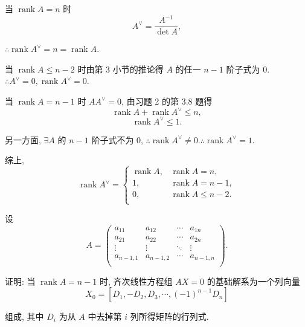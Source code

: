 \documentclass{ctexart}
\begin{document}
\begin{solution}
    当 $\operatorname{rank}A=n$ 时
    \[A^\vee=\dfrac{A^{-1}}{\det A},\]

    $\therefore\operatorname{rank}A^\vee=n=\operatorname{rank}A$.

    当 $\operatorname{rank}A\leq n-2$ 时由第 3 小节的推论得 $A$ 的任一 $n-1$ 阶子式为 $0$. $\therefore A^\vee=0,\operatorname{rank}A^\vee=0$.

    当 $\operatorname{rank}A=n-1$ 时 $AA^\vee=0$, 由习题 2 的第 3.8 题得
    \[\operatorname{rank}A+\operatorname{rank}A^\vee\leq n,\]
    \[\operatorname{rank}A^\vee\leq1.\]

    另一方面, $\exists A$ 的 $n-1$ 阶子式不为 $0$, $\therefore\operatorname{rank}A^\vee\neq0.\therefore\operatorname{rank}A^\vee=1$.

    综上,
    \[\operatorname{rank}A^\vee=\begin{cases}
        \operatorname{rank}A, & \operatorname{rank}A=n, \\
        1, & \operatorname{rank}A=n-1, \\
        0, & \operatorname{rank}A\leq n-2. \\
    \end{cases}\]
\end{solution}
\begin{exercise}%
    设
    \[A=\begin{pmatrix}
        a_{11} & a_{12} & \cdots & a_{1n} \\
        a_{21} & a_{22} & \cdots & a_{2n} \\
        \vdots & \vdots & \ddots & \vdots \\
        a_{n-1,1} & a_{n-1,2} & \cdots & a_{n-1,n} \\
    \end{pmatrix}.\]

    证明: 当 $\operatorname{rank}A=n-1$ 时, 齐次线性方程组 $AX=0$ 的基础解系为一个列向量
    \[X_0=[D_1,-D_2,D_3,\cdots,(-1)^{n-1}D_n]\]

    组成, 其中 $D_i$ 为从 $A$ 中去掉第 $i$ 列所得矩阵的行列式.
\end{exercise}
\end{document}
